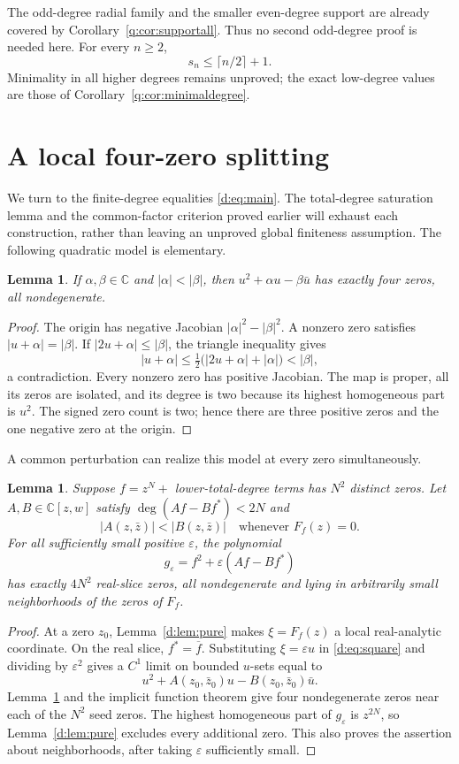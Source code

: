 \documentclass[UTF8,11pt]{ctexart}
\newtheorem{lem}[thm]{Lemma}
\theoremstyle{definition}
\numberwithin{equation}{section}
\newcommand{\C}{\mathbb C}\newcommand{\R}{\mathbb R}
\newcommand{\eps}{\varepsilon}\newcommand{\ep}{\varepsilon}
\begin{document}
The odd-degree radial family and the smaller even-degree support are
already covered by Corollary~\ref{q:cor:supportall}. Thus no second
odd-degree proof is needed here. For every $n\ge2$,
\[
 s_n\le\lceil n/2\rceil+1.
\]
Minimality in all higher degrees remains unproved; the exact low-degree
values are those of Corollary~\ref{q:cor:minimaldegree}.

\section{A local four-zero splitting}\label{d:sec:basic}
We turn to the finite-degree equalities \eqref{d:eq:main}. The total-degree
saturation lemma and the common-factor criterion proved earlier will
exhaust each construction, rather than leaving an unproved global
finiteness assumption. The following quadratic model is elementary.
\begin{lem}\label{d:lem:quadratic}
If $\alpha,\beta\in\C$ and $|\alpha|<|\beta|$, then
$u^2+\alpha u-\beta\bar u$ has exactly four zeros, all nondegenerate.
\end{lem}
\begin{proof}
The origin has negative Jacobian $|\alpha|^2-|\beta|^2$. A nonzero zero
satisfies $|u+\alpha|=|\beta|$. If $|2u+\alpha|\le|\beta|$, the triangle
inequality gives
\[
 |u+\alpha|\le\tfrac12\bigl(|2u+\alpha|+|\alpha|\bigr)<|\beta|,
\]
a contradiction. Every nonzero zero has positive Jacobian. The map is
proper, all its zeros are isolated, and its degree is two because its
highest homogeneous part is $u^2$. The signed zero count is two; hence
there are three positive zeros and the one negative zero at the origin.
\end{proof}

A common perturbation can realize this model at every zero simultaneously.
\begin{lem}\label{d:lem:square}
Suppose $f=z^N+$ lower-total-degree terms has $N^2$ distinct zeros.
Let $A,B\in\C[z,w]$ satisfy $\deg(Af-Bf^*)<2N$ and
\[
 |A(z,\bar z)|<|B(z,\bar z)|\quad\text{whenever }F_f(z)=0.
\]
For all sufficiently small positive $\eps$, the polynomial
\begin{equation}\label{d:eq:square}
 g_\eps=f^2+\eps(Af-Bf^*)
\end{equation}
has exactly $4N^2$ real-slice zeros, all nondegenerate and lying in
arbitrarily small neighborhoods of the zeros of $F_f$.
\end{lem}
\begin{proof}
At a zero $z_0$, Lemma~\ref{d:lem:pure} makes $\xi=F_f(z)$ a local
real-analytic coordinate. On the real slice, $f^*=\overline f$. Substituting
$\xi=\eps u$ in \eqref{d:eq:square} and dividing by $\eps^2$ gives a
$C^1$ limit on bounded $u$-sets equal to
\[
 u^2+A(z_0,\bar z_0)u-B(z_0,\bar z_0)\bar u.
\]
Lemma~\ref{d:lem:quadratic} and the implicit function theorem give four
nondegenerate zeros near each of the $N^2$ seed zeros. The highest
homogeneous part of $g_\eps$ is $z^{2N}$, so Lemma~\ref{d:lem:pure}
excludes every additional zero. This also proves the assertion about
neighborhoods, after taking $\eps$ sufficiently small.
\end{proof}
\end{document}
